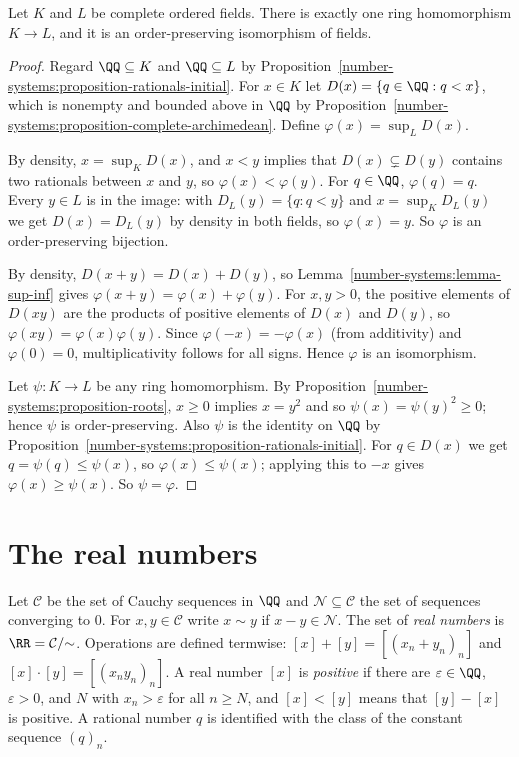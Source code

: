 \begin{theorem}\label{number-systems:theorem-uniqueness-reals}
Let $K$ and $L$ be complete ordered fields. There is exactly one ring
homomorphism $K \to L$, and it is an order-preserving isomorphism of fields.
\end{theorem}

\begin{proof}
Regard $\QQ \subseteq K$ and $\QQ \subseteq L$ by
Proposition~\ref{number-systems:proposition-rationals-initial}. For $x \in K$ let
$D(x) = \{q \in \QQ : q < x\}$, which is nonempty and bounded above in $\QQ$ by
Proposition~\ref{number-systems:proposition-complete-archimedean}. Define
$\varphi(x) = \sup_L D(x)$.

By density, $x = \sup_K D(x)$, and $x < y$ implies that $D(x) \subsetneq D(y)$
contains two rationals between $x$ and $y$, so $\varphi(x) < \varphi(y)$. For
$q \in \QQ$, $\varphi(q) = q$. Every $y \in L$ is in the image: with
$D_L(y) = \{q : q < y\}$ and $x = \sup_K D_L(y)$ we get $D(x) = D_L(y)$ by density
in both fields, so $\varphi(x) = y$. So $\varphi$ is an order-preserving bijection.

By density, $D(x + y) = D(x) + D(y)$, so
Lemma~\ref{number-systems:lemma-sup-inf} gives $\varphi(x + y) = \varphi(x) + \varphi(y)$.
For $x, y > 0$, the positive elements of $D(xy)$ are the products of positive
elements of $D(x)$ and $D(y)$, so $\varphi(xy) = \varphi(x)\varphi(y)$. Since
$\varphi(-x) = -\varphi(x)$ (from additivity) and $\varphi(0) = 0$, multiplicativity
follows for all signs. Hence $\varphi$ is an isomorphism.

Let $\psi \colon K \to L$ be any ring homomorphism. By
Proposition~\ref{number-systems:proposition-roots}, $x \geq 0$ implies
$x = y^2$ and so $\psi(x) = \psi(y)^2 \geq 0$; hence $\psi$ is order-preserving.
Also $\psi$ is the identity on $\QQ$ by
Proposition~\ref{number-systems:proposition-rationals-initial}. For $q \in D(x)$ we
get $q = \psi(q) \leq \psi(x)$, so $\varphi(x) \leq \psi(x)$; applying this to $-x$
gives $\varphi(x) \geq \psi(x)$. So $\psi = \varphi$.
\end{proof}

\section{The real numbers}\label{number-systems:section-reals}

\begin{definition}\label{number-systems:definition-reals}
Let $\mathcal{C}$ be the set of Cauchy sequences in $\QQ$ and
$\mathcal{N} \subseteq \mathcal{C}$ the set of sequences converging to $0$. For
$x, y \in \mathcal{C}$ write $x \sim y$ if $x - y \in \mathcal{N}$. The set of
\emph{real numbers} is $\RR = \mathcal{C}/{\sim}$. Operations are defined
termwise: $[x] + [y] = [(x_n + y_n)_n]$ and $[x] \cdot [y] = [(x_n y_n)_n]$. A real
number $[x]$ is \emph{positive} if there are $\varepsilon \in \QQ$, $\varepsilon > 0$,
and $N$ with $x_n > \varepsilon$ for all $n \geq N$, and $[x] < [y]$ means that
$[y] - [x]$ is positive. A rational number $q$ is identified with the class of
the constant sequence $(q)_n$.
\end{definition}

